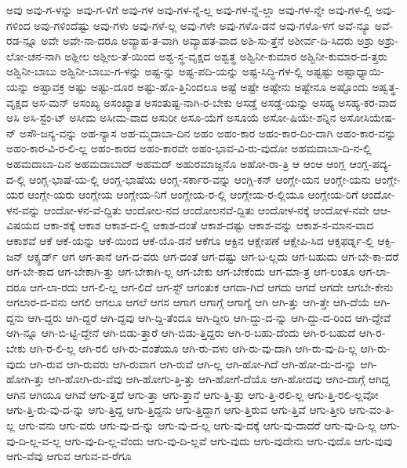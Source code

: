 {ಅವು
ಅವು-ಗ-ಳನ್ನು
ಅವು-ಗ-ಳಿಗೆ
ಅವು-ಗಳ
ಅವು-ಗಳ-ನ್ನೆ-ಲ್ಲ
ಅವು-ಗಳ-ನ್ನೆ-ಲ್ಲಾ
ಅವು-ಗಳ-ನ್ನೇ
ಅವು-ಗಳ-ಲ್ಲಿ
ಅವು-ಗಳಿಂದ
ಅವು-ಗಳಿಂದೆಷ್ಟು
ಅವು-ಗಳು
ಅವು-ಗಳೆ-ಲ್ಲ
ಅವು-ಗಳೇ
ಅವು-ಗಳೊ-ಡನೆ
ಅವು-ಗಳೊ-ಳಗೆ
ಅವೆ-ನ್ಯೂ
ಅವೆ-ರಡ-ನ್ನೂ
ಅವೇ
ಅವೇ-ನಾ-ದರೂ
ಅವ್ಯಾಹ-ತ-ವಾಗಿ
ಅವ್ಯಾಹತ-ವಾದ
ಅಶಿ-ಸು-ತ್ತೆನೆ
ಅಶೀರ್ವ-ದಿ-ಸಿದರು
ಅಶ್ರು
ಅಶ್ರು-ಲೋ-ಚನ-ನಾಗಿ
ಅಶ್ಲೀಲ
ಅಶ್ಲೀಲ-ತೆ-ಯಿಂದ
ಅಶ್ವ-ಸ್ಥ-ವೃಕ್ಷದ
ಅಶ್ವತ್ಥ
ಅಶ್ವಿನೀ-ಕುಮಾರ
ಅಶ್ವಿನೀ-ಕುಮಾರ-ದ-ತ್ತರು
ಅಶ್ವಿನೀ-ಬಾಬು
ಅಶ್ವಿನೀ-ಬಾಬು-ಗ-ಳನ್ನು
ಅಷ್ಟ-ನ್ನು
ಅಷ್ಟ-ಪದಿ-ಯನ್ನು
ಅಷ್ಟ-ಸಿದ್ಧಿ-ಗಳ-ಲ್ಲಿ
ಅಷ್ಟಷ್ಟು
ಅಷ್ಟಾಧ್ಯಾಯಿ-ಯನ್ನು
ಅಷ್ಟಾವಕ್ರ
ಅಷ್ಟು
ಅಷ್ಟು-ದೂರ
ಅಷ್ಟು-ಹೊ-ತ್ತಿನಿಂದಲೂ
ಅಷ್ಟೆ
ಅಷ್ಟೇ
ಅಷ್ಟೇನು
ಅಷ್ಟೇನೂ
ಅಷ್ಟೊಂದು
ಅಷ್ವತ್ಥ-ವೃಕ್ಷದ
ಅಸ-ಮನ್
ಅಸಂಖ್ಯ
ಅಸಂಖ್ಯಾತ
ಅಸಂತುಷ್ಟ-ನಾಗಿ-ರ-ಬೇಕು
ಅಸಡ್ಡೆ
ಅಸಡ್ಡೆ-ಯನ್ನು
ಅಸಹ್ಯ
ಅಸಹ್ಯ-ಕರ-ವಾದ
ಅಸಿ
ಅಸಿ-ಸ್ಟೆಂ-ಟ್
ಅಸೀಮ
ಅಸೀಮ-ವಾದ
ಅಸುರೀ
ಅಸೂ-ಯೆಗೆ
ಅಸೂಯೆ
ಅಸೋ-ಷಿಯೇ-ಶನ್ನಿನ
ಅಸೋಸಿಯೇಷ-ನ್
ಅಸೌ-ಜನ್ಯ-ವನ್ನು
ಅಹ-ನ್ಯಾಸ
ಅಹ-ಮ್ಮದಾಬಾ-ದಿನ
ಅಹಂ
ಅಹಂ-ಕಾರ
ಅಹಂ-ಕಾರ-ದಿಂ-ದಾಗಿ
ಅಹಂ-ಕಾರ-ವನ್ನು
ಅಹಂ-ಕಾರ-ವಿ-ರ-ಲಿ-ಲ್ಲ
ಅಹಂ-ಕಾರದ
ಅಹಂ-ಕಾರವೇ
ಅಹಂ-ಭಾವ-ವಿ-ರು-ವುದೋ
ಅಹಮದಾಬಾ-ದಿ-ನ-ಲ್ಲಿ
ಅಹಮದಾಬಾ-ದಿನ
ಅಹಮದಾಬಾದ್
ಅಹಮದ್
ಅಹುರಮಾಜ್ದನೊ
ಅಹೋ-ರಾ-ತ್ರಿ
ಆ
ಆಂಆ
ಆಂಗ್ಲ
ಆಂಗ್ಲ-ಪದ್ಯ-ದ-ಲ್ಲಿ
ಆಂಗ್ಲ-ಭಾಷೆ-ಯ-ಲ್ಲಿ
ಆಂಗ್ಲ-ಭಾಷೆಯ
ಆಂಗ್ಲ-ಸರ್ಕಾರ-ವನ್ನು
ಆಂಗ್ಲಿ-ಕನ್
ಆಂಗ್ಲೇ-ಯನ
ಆಂಗ್ಲೇ-ಯನು
ಆಂಗ್ಲೇ-ಯರ
ಆಂಗ್ಲೇ-ಯರು
ಆಂಗ್ಲೇಯ
ಆಂಗ್ಲೇಯ-ನಿಗೆ
ಆಂಗ್ಲೇಯ-ರ-ಲ್ಲಿ
ಆಂಗ್ಲೇಯ-ರ-ಲ್ಲಿಯೂ
ಆಂಗ್ಲೇಯ-ರಿಗೆ
ಆಂದೋ-ಳನ-ವನ್ನು
ಆಂದೋ-ಳನ-ವೆ-ದ್ದಿತು
ಆಂದೋಲ-ನದ
ಆಂದೋಲನವೆ-ದ್ದಿತು
ಆಂದೋಳ-ನಕ್ಕೆ
ಆಂದೋಳ-ನವೇ
ಆಆ-ವಿಷಯದ
ಆಕಾ-ಶಕ್ಕೆ
ಆಕಾಶ
ಆಕಾಶ-ದ-ಲ್ಲಿ
ಆಕಾಶ-ದಂತೆ
ಆಕಾಶ-ದಷ್ಟು
ಆಕಾಶ-ವನ್ನು
ಆಕಾಶ-ಸ-ಮಾನ-ವಾದ
ಆಕಾಶವೆ
ಆಕೆ
ಆಕೆ-ಯನ್ನು
ಆಕೆ-ಯಿಂದ
ಆಕೆ-ಯೊ-ಡನೆ
ಆಕೆಗೂ
ಆಕ್ಟಿನ
ಆಕ್ಷೇಪಣೆ
ಆಕ್ಷೇಪಿ-ಸಿದ
ಆಕ್ಸಫರ್ಡ್ನ-ಲ್ಲಿ
ಆಕ್ಸಿ-ಜನ್
ಆಕ್ಸ್ಫರ್ಡ್
ಆಗ
ಆಗ-ತಾನೆ
ಆಗ-ದ-ವರು
ಆಗ-ದಂತೆ
ಆಗ-ದಷ್ಟು
ಆಗ-ಬ-ಲ್ಲದು
ಆಗ-ಬಹುದು
ಆಗ-ಬೇ-ಕಾ-ದರೆ
ಆಗ-ಬೇ-ಕಾದ
ಆಗ-ಬೇಕಾಗಿ-ತ್ತು
ಆಗ-ಬೇಕಾಗಿ-ಲ್ಲ
ಆಗ-ಬೇಕು
ಆಗ-ಬೇಕೆಂದು
ಆಗ-ಮಾ-ತ್ರ
ಆಗ-ಲಂತೂ
ಆಗ-ಲಾ-ದರೂ
ಆಗ-ಲಾ-ರದು
ಆಗ-ಲಿ-ಲ್ಲ
ಆಗ-ಲಿದೆ
ಆಗ-ಸ್ಟ್
ಆಗಂತುಕ
ಆಗದಾ-ಗಿದೆ
ಆಗದು
ಆಗದೆ
ಆಗದೇ
ಆಗಬೇ-ಕೇನು
ಆಗಲಾರ-ದ-ವನು
ಆಗಲಿ
ಆಗಲೂ
ಆಗಲೆ
ಆಗಸ
ಆಗಾಗ
ಆಗಾಗ್ಗೆ
ಆಗಾಗ್ಯೆ
ಆಗಿ
ಆಗಿ-ತ್ತು
ಆಗಿ-ತ್ತೇ
ಆಗಿ-ದೆಯೆ
ಆಗಿ-ದ್ದನು
ಆಗಿ-ದ್ದರು
ಆಗಿ-ದ್ದರೆ
ಆಗಿ-ದ್ದವು
ಆಗಿ-ದ್ದಿ-ತೆಂದೂ
ಆಗಿ-ದ್ದೀರಿ
ಆಗಿ-ದ್ದು-ದ-ನ್ನು
ಆಗಿ-ದ್ದು-ದ-ರಿಂದ
ಆಗಿ-ದ್ದೇವೆ
ಆಗಿ-ನ್ನೂ
ಆಗಿ-ಬಿ-ಟ್ಟಿ-ದ್ದೇನೆ
ಆಗಿ-ಬಿಡು-ತ್ತಾರೆ
ಆಗಿ-ಬಿಡು-ತ್ತಿದ್ದರು
ಆಗಿ-ರ-ಬಹು-ದೆಂದು
ಆಗಿ-ರ-ಬಹುದೆ
ಆಗಿ-ರ-ಬೇಕು
ಆಗಿ-ರ-ಲಿ-ಲ್ಲ
ಆಗಿ-ರಲಿ
ಆಗಿ-ರು-ವಂತೆಯೂ
ಆಗಿ-ರು-ವಳು
ಆಗಿ-ರು-ವು-ದಾಗಿ
ಆಗಿ-ರು-ವು-ದಿ-ಲ್ಲ
ಆಗಿ-ರು-ವುದು
ಆಗಿ-ರುವ
ಆಗಿ-ರುವರು
ಆಗಿ-ರುವಾಗ
ಆಗಿ-ರುವೆ
ಆಗಿ-ಲ್ಲ
ಆಗಿ-ಹೋ-ಗಿದೆ
ಆಗಿ-ಹೋ-ದು-ದ-ನ್ನು
ಆಗಿ-ಹೋಗಿ-ತ್ತು
ಆಗಿ-ಹೋಗಿ-ರು-ವೆವು
ಆಗಿ-ಹೋಗು-ತ್ತಿ-ತ್ತು
ಆಗಿ-ಹೋಗೆ-ದೆಯೊ
ಆಗಿ-ಹೋದವು
ಆಗಿಂ-ದಾಗ್ಗೆ
ಆಗಿದ್ದ
ಆಗಿನ
ಆಗಿಯೂ
ಆಗಿವೆ
ಆಗು-ತ್ತದೆ
ಆಗು-ತ್ತಾ
ಆಗು-ತ್ತಾನೆ
ಆಗು-ತ್ತಿ-ತ್ತು
ಆಗು-ತ್ತಿ-ರಲಿ-ಲ್ಲ
ಆಗು-ತ್ತಿ-ರಲಿ-ಲ್ಲವೋ
ಆಗು-ತ್ತಿ-ರು-ವು-ದ-ನ್ನು
ಆಗು-ತ್ತಿದ್ದ
ಆಗು-ತ್ತಿದ್ದನು
ಆಗು-ತ್ತಿದ್ದಾಗ
ಆಗು-ತ್ತಿರುವ
ಆಗು-ತ್ತಿವೆ
ಆಗು-ತ್ತೀರಿ
ಆಗು-ವಂ-ತಿ-ಲ್ಲ
ಆಗು-ವನು
ಆಗು-ವರು
ಆಗು-ವು-ದ-ನ್ನು
ಆಗು-ವು-ದ-ಲ್ಲ
ಆಗು-ವು-ದಕ್ಕೆ
ಆಗು-ವು-ದಾದರೆ
ಆಗು-ವು-ದಿ-ಲ್ಲ
ಆಗು-ವು-ದಿ-ಲ್ಲ-ವ-ಲ್ಲ
ಆಗು-ವು-ದಿ-ಲ್ಲ-ವೆಂದು
ಆಗು-ವು-ದಿ-ಲ್ಲವೆ
ಆಗು-ವುದು
ಆಗು-ವುದೇನು
ಆಗು-ವುದೊ
ಆಗು-ವುವು
ಆಗು-ವೆವು
ಆಗುವ
ಆಗುವ-ವ-ರೆಗೂ
}
